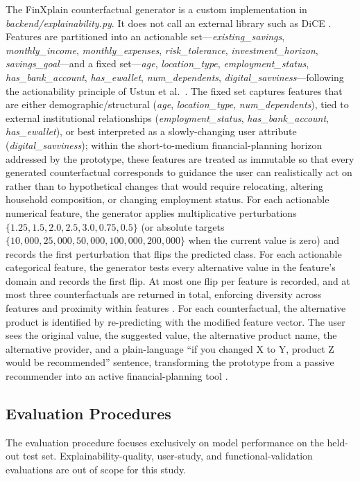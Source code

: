 \documentclass{icsthesis}
\begin{document}
\begin{mainmatter}
					The FinXplain counterfactual generator is a custom implementation in \emph{backend/explainability.py}. It does not call an external library such as DiCE \cite{ref73}. Features are partitioned into an actionable set---\emph{existing\_savings}, \emph{monthly\_income}, \emph{monthly\_expenses}, \emph{risk\_tolerance}, \emph{investment\_horizon}, \emph{savings\_goal}---and a fixed set---\emph{age}, \emph{location\_type}, \emph{employment\_status}, \emph{has\_bank\_account}, \emph{has\_ewallet}, \emph{num\_dependents}, \emph{digital\_savviness}---following the actionability principle of Ustun et al.\ \cite{ref86}. The fixed set captures features that are either demographic/structural (\emph{age}, \emph{location\_type}, \emph{num\_dependents}), tied to external institutional relationships (\emph{employment\_status}, \emph{has\_bank\_account}, \emph{has\_ewallet}), or best interpreted as a slowly-changing user attribute (\emph{digital\_savviness}); within the short-to-medium financial-planning horizon addressed by the prototype, these features are treated as immutable so that every generated counterfactual corresponds to guidance the user can realistically act on rather than to hypothetical changes that would require relocating, altering household composition, or changing employment status. For each actionable numerical feature, the generator applies multiplicative perturbations $\{1.25, 1.5, 2.0, 2.5, 3.0, 0.75, 0.5\}$ (or absolute targets $\{10{,}000, 25{,}000, 50{,}000, 100{,}000, 200{,}000\}$ when the current value is zero) and records the first perturbation that flips the predicted class. For each actionable categorical feature, the generator tests every alternative value in the feature's domain and records the first flip. At most one flip per feature is recorded, and at most three counterfactuals are returned in total, enforcing diversity across features \cite{ref73} and proximity within features \cite{ref20}. For each counterfactual, the alternative product is identified by re-predicting with the modified feature vector. The user sees the original value, the suggested value, the alternative product name, the alternative provider, and a plain-language ``if you changed X to Y, product Z would be recommended'' sentence, transforming the prototype from a passive recommender into an active financial-planning tool \cite{ref72}.

			\subsection{Evaluation Procedures}
				The evaluation procedure focuses exclusively on model performance on the held-out test set. Explainability-quality, user-study, and functional-validation evaluations are out of scope for this study.


\end{mainmatter}
\end{document}
